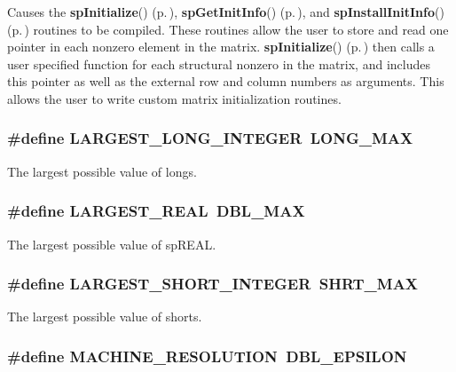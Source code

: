 Causes the {\bf sp\-Initialize}() {\rm (p.\,\pageref{spBuild_8c_a21})}, {\bf sp\-Get\-Init\-Info}() {\rm (p.\,\pageref{spBuild_8c_a23})}, and {\bf sp\-Install\-Init\-Info}() {\rm (p.\,\pageref{spBuild_8c_a22})} routines to be compiled. These routines allow the user to store and read one pointer in each nonzero element in the matrix. {\bf sp\-Initialize}() {\rm (p.\,\pageref{spBuild_8c_a21})} then calls a user specified function for each structural nonzero in the matrix, and includes this pointer as well as the external row and column numbers as arguments. This allows the user to write custom matrix initialization routines. 
\subsubsection{\setlength{\rightskip}{0pt plus 5cm}\#define LARGEST\_\-LONG\_\-INTEGER\ LONG\_\-MAX}\label{spConfig_8h_a44}


The largest possible value of longs. 
\subsubsection{\setlength{\rightskip}{0pt plus 5cm}\#define LARGEST\_\-REAL\ DBL\_\-MAX}\label{spConfig_8h_a41}


The largest possible value of sp\-REAL. 
\subsubsection{\setlength{\rightskip}{0pt plus 5cm}\#define LARGEST\_\-SHORT\_\-INTEGER\ SHRT\_\-MAX}\label{spConfig_8h_a43}


The largest possible value of shorts. 
\subsubsection{\setlength{\rightskip}{0pt plus 5cm}\#define MACHINE\_\-RESOLUTION\ DBL\_\-EPSILON}\label{spConfig_8h_a40}


